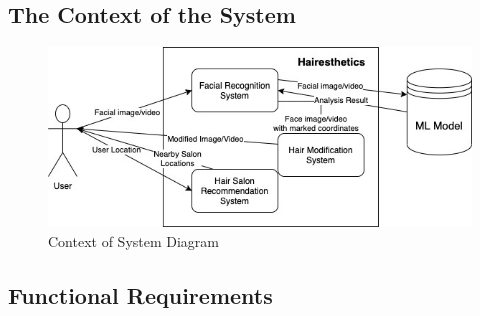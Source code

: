 \documentclass[12pt]{article}
\begin{document}
\subsection{The Context of the System}
\begin{figure}[h!]
\begin{center}
 \includegraphics[width=1\textwidth]{system_context_diagram_2}
\caption{Context of System Diagram}
\end{center}
\end{figure}

\subsection{Functional Requirements }
\end{document}
